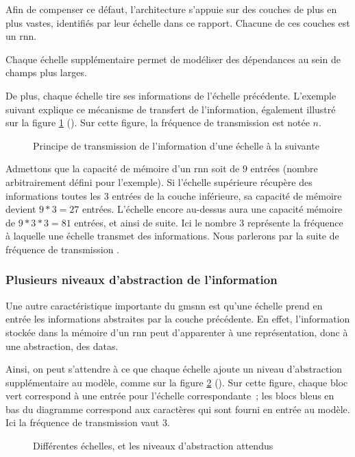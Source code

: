 {Afin de compenser ce défaut, l'architecture  s'appuie sur des couches de plus en plus vastes, identifiés par leur échelle dans ce rapport.
Chacune de ces couches est un \gls{rnn}.

Chaque échelle supplémentaire permet de modéliser des dépendances au sein de champs plus larges.

De plus, chaque échelle tire ses informations de l'échelle précédente.
L'exemple suivant explique ce mécanisme de transfert de l'information, également illustré sur la figure \ref{fig:gmsnn_transmit} (). Sur cette figure, la fréquence de transmission est notée $n$.

\begin{figure}[ht]
	\centering
	
	\caption{Principe de transmission de l'information d'une échelle à la suivante}
	\label{fig:gmsnn_transmit}
\end{figure}

Admettons que la capacité de mémoire d'un \gls{rnn} soit de $9$ entrées (nombre arbitrairement défini pour l'exemple).
Si l'échelle supérieure récupère des informations toutes les $3$ entrées de la couche inférieure, sa capacité de mémoire devient $9*3=27$ entrées.
L'échelle encore au-dessus aura une capacité mémoire de  $9*3*3=81$ entrées, et ainsi de suite.
Ici le nombre $3$ représente la fréquence à laquelle une échelle transmet des informations. Nous parlerons par la suite de \og fréquence de transmission \fg{}.

\subsubsection{Plusieurs niveaux d'abstraction de l'information}
Une autre caractéristique importante du \gls{gmsnn} est qu'une échelle prend en entrée les informations abstraites par la couche précédente. En effet, l'information stockée dans la mémoire d'un \gls{rnn} peut d'apparenter à une représentation, donc à une abstraction, des \glspl{data}.

Ainsi, on peut s'attendre à ce que chaque échelle ajoute un niveau d'abstraction supplémentaire au modèle, comme sur la figure \ref{fig:gmsnn_ms} ().
Sur cette figure, chaque bloc vert correspond à une entrée pour l'échelle correspondante~; les blocs bleus en bas du diagramme correspond aux caractères qui sont fourni en entrée au modèle.
Ici la fréquence de transmission vaut 3.

\begin{figure}[ht]
	\centering
	
	\caption{%
		Différentes échelles, et les niveaux d'abstraction attendus}
	\label{fig:gmsnn_ms}
\end{figure}


}
